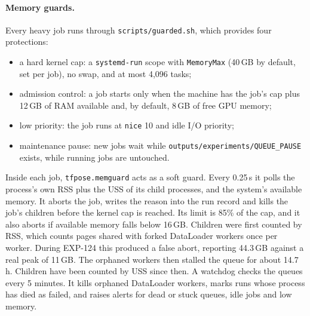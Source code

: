 \paragraph{Memory guards.}
Every heavy job runs through \texttt{scripts/guarded.sh}, which provides four protections:
\begin{itemize}
  \item a hard kernel cap: a \texttt{systemd-run} scope with \texttt{MemoryMax} (40\,GB by default, set per job), no swap, and at most 4{,}096 tasks;
  \item admission control: a job starts only when the machine has the job's cap plus 12\,GB of RAM available and, by default, 8\,GB of free GPU memory;
  \item low priority: the job runs at \texttt{nice} 10 and idle I/O priority;
  \item maintenance pause: new jobs wait while \texttt{outputs/experiments/QUEUE\_PAUSE} exists, while running jobs are untouched.
\end{itemize}
Inside each job, \texttt{tfpose.memguard} acts as a soft guard. Every 0.25\,s it polls the process's own RSS plus the USS of its child processes, and the system's available memory. It aborts the job, writes the reason into the run record and kills the job's children before the kernel cap is reached. Its limit is 85\% of the cap, and it also aborts if available memory falls below 16\,GB.
Children were first counted by RSS, which counts pages shared with forked DataLoader workers once per worker. During EXP-124 this produced a false abort, reporting 44.3\,GB against a real peak of 11\,GB. The orphaned workers then stalled the queue for about 14.7\,h. Children have been counted by USS since then.
A watchdog checks the queues every 5 minutes. It kills orphaned DataLoader workers, marks runs whose process has died as failed, and raises alerts for dead or stuck queues, idle jobs and low memory.

